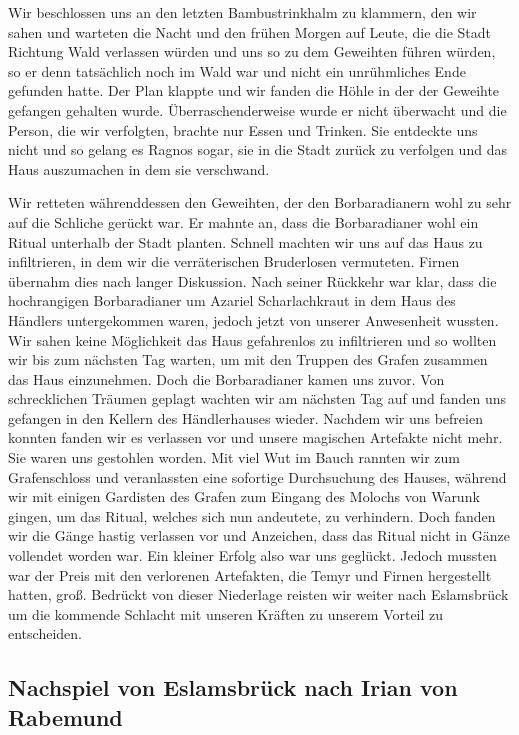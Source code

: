 Wir beschlossen uns an den letzten Bambustrinkhalm zu klammern, den wir sahen und warteten die Nacht und den frühen Morgen auf Leute, die die Stadt Richtung Wald verlassen würden und uns so zu dem Geweihten führen würden, so er denn tatsächlich noch im Wald war und nicht ein unrühmliches Ende gefunden hatte. Der Plan klappte und wir fanden die Höhle in der der Geweihte gefangen gehalten wurde. Überraschenderweise wurde er nicht überwacht und die Person, die wir verfolgten, brachte nur Essen und Trinken. Sie entdeckte uns nicht und so gelang es Ragnos sogar, sie in die Stadt zurück zu verfolgen und das Haus auszumachen in dem sie verschwand.

Wir retteten währenddessen den Geweihten, der den Borbaradianern wohl zu sehr auf die Schliche gerückt war. Er mahnte an, dass die Borbaradianer wohl ein Ritual unterhalb der Stadt planten. Schnell machten wir uns auf das Haus zu infiltrieren, in dem wir die verräterischen Bruderlosen vermuteten. Firnen übernahm dies nach langer Diskussion. Nach seiner Rückkehr war klar, dass die hochrangigen Borbaradianer um Azariel Scharlachkraut in dem Haus des Händlers untergekommen waren, jedoch jetzt von unserer Anwesenheit wussten. Wir sahen keine Möglichkeit das Haus gefahrenlos zu infiltrieren und so wollten wir bis zum nächsten Tag warten, um mit den Truppen des Grafen zusammen das Haus einzunehmen. Doch die Borbaradianer kamen uns zuvor. Von schrecklichen Träumen geplagt wachten wir am nächsten Tag auf und fanden uns gefangen in den Kellern des Händlerhauses wieder. Nachdem wir uns befreien konnten fanden wir es verlassen vor und unsere magischen Artefakte nicht mehr. Sie waren uns gestohlen worden. Mit viel Wut im Bauch rannten wir zum Grafenschloss und veranlassten eine sofortige Durchsuchung des Hauses, während wir mit einigen Gardisten des Grafen zum Eingang des Molochs von Warunk gingen, um das Ritual, welches sich nun andeutete, zu verhindern. Doch fanden wir die Gänge hastig verlassen vor und Anzeichen, dass das Ritual nicht in Gänze vollendet worden war. Ein kleiner Erfolg also war uns geglückt. Jedoch mussten war der Preis mit den verlorenen Artefakten, die Temyr und Firnen hergestellt hatten, groß. Bedrückt von dieser Niederlage reisten wir weiter nach Eslamsbrück um die kommende Schlacht mit unseren Kräften zu unserem Vorteil zu entscheiden.


\subsection{Nachspiel von Eslamsbrück nach Irian von Rabemund}

